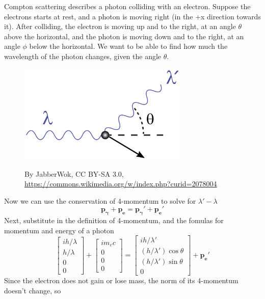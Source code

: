\documentclass[12pt]{article}
\begin{document}
Compton scattering describes a photon colliding with an electron. Suppose the  electrons starts at rest, and a photon is moving right (in the +x direction towards it). After colliding, the electron is moving up and to the right, at an angle $\theta$ above the horizontal, and the photon is moving down and to the right, at an angle $\phi$ below the horizontal. We want to be able to find how much the wavelength of the photon changes, given the angle $\theta$.

\begin{figure}[h]
\includegraphics[width=8cm]{Compton-scattering.png}
\centering

By JabberWok, CC BY-SA 3.0, \url{https://commons.wikimedia.org/w/index.php?curid=2078004}
\end{figure}
Now we can use the conservation of 4-momentum to solve for $\lambda' - \lambda$
\[ \boldsymbol{p_\gamma} + \boldsymbol{p_e} = \boldsymbol{p_\gamma '} + \boldsymbol{p_e '} \]
Next, substitute in the definition of 4-momentum, and the fomulas for momentum and energy of a photon
\[ \begin{bmatrix} i h / \lambda \\ h / \lambda \\ 0 \\ 0 \end{bmatrix}
+ \begin{bmatrix} i m_e c \\ 0 \\ 0 \\ 0 \end{bmatrix}
= \begin{bmatrix} i h / \lambda' \\ (h / \lambda') \cos \theta \\ (h / \lambda') \sin \theta \\ 0 \end{bmatrix}
+ \boldsymbol{p_e '} \]
Since the electron does not gain or lose mass, the norm of its 4-momentum doesn't change, so
\end{document}
